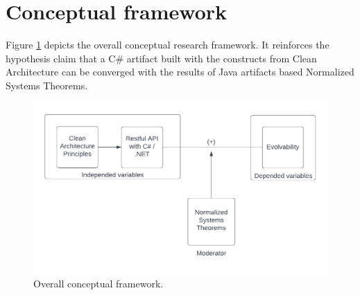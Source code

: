 \section{Conceptual framework} 
\label{conceptualframework}

Figure \ref{fig:overall_conceptual_framework} depicts the overall conceptual research
framework. It reinforces the hypothesis claim that a C\# artifact built with the
constructs from Clean Architecture can be converged with the results of Java artifacts based
Normalized Systems Theorems. 

\begin{figure}[!ht]
    \centering
    \includegraphics[width=1\textwidth]{Figures/overall_conceptual_framework}
    \caption[Overall conceptual framework]{Overall conceptual framework.}
    \label{fig:overall_conceptual_framework}
\end{figure}
